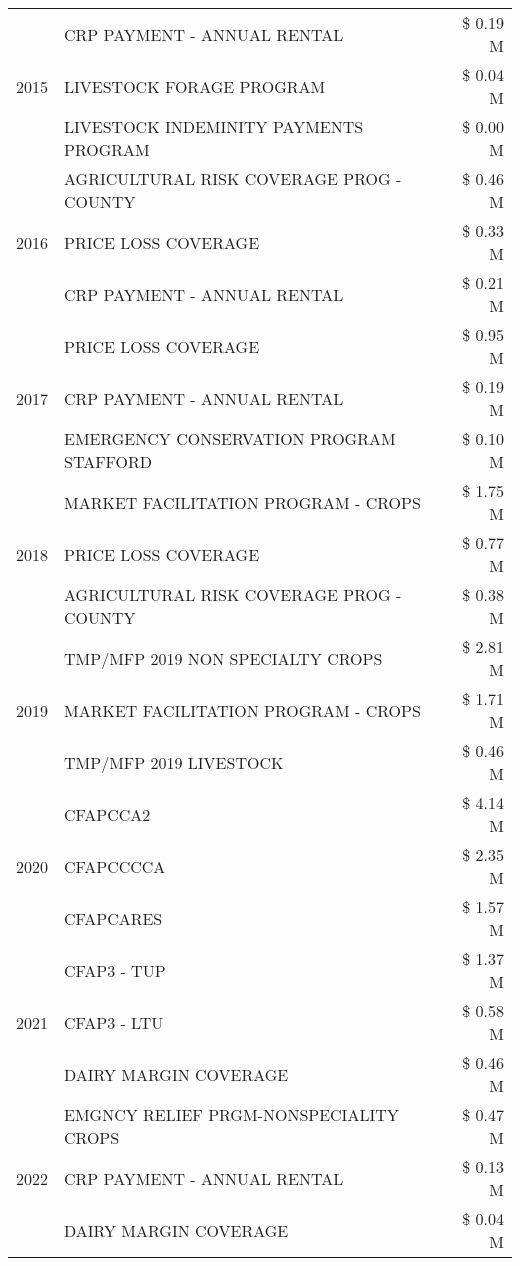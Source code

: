 \begin{tabular}{llr}
\multirow[t]{3}{*}{2015} & CRP PAYMENT - ANNUAL RENTAL & \$ 0.19 M \\
 & LIVESTOCK FORAGE PROGRAM & \$ 0.04 M \\
 & LIVESTOCK INDEMINITY PAYMENTS PROGRAM & \$ 0.00 M \\
\cline{1-3}
\multirow[t]{3}{*}{2016} & AGRICULTURAL RISK COVERAGE PROG - COUNTY & \$ 0.46 M \\
 & PRICE LOSS COVERAGE & \$ 0.33 M \\
 & CRP PAYMENT - ANNUAL RENTAL & \$ 0.21 M \\
\cline{1-3}
\multirow[t]{3}{*}{2017} & PRICE LOSS COVERAGE & \$ 0.95 M \\
 & CRP PAYMENT - ANNUAL RENTAL & \$ 0.19 M \\
 & EMERGENCY CONSERVATION PROGRAM STAFFORD & \$ 0.10 M \\
\cline{1-3}
\multirow[t]{3}{*}{2018} & MARKET FACILITATION PROGRAM - CROPS & \$ 1.75 M \\
 & PRICE LOSS COVERAGE & \$ 0.77 M \\
 & AGRICULTURAL RISK COVERAGE PROG - COUNTY & \$ 0.38 M \\
\cline{1-3}
\multirow[t]{3}{*}{2019} & TMP/MFP 2019 NON SPECIALTY CROPS & \$ 2.81 M \\
 & MARKET FACILITATION PROGRAM - CROPS & \$ 1.71 M \\
 & TMP/MFP 2019 LIVESTOCK & \$ 0.46 M \\
\cline{1-3}
\multirow[t]{3}{*}{2020} & CFAPCCA2 & \$ 4.14 M \\
 & CFAPCCCCA & \$ 2.35 M \\
 & CFAPCARES & \$ 1.57 M \\
\cline{1-3}
\multirow[t]{3}{*}{2021} & CFAP3 - TUP & \$ 1.37 M \\
 & CFAP3 - LTU & \$ 0.58 M \\
 & DAIRY MARGIN COVERAGE & \$ 0.46 M \\
\cline{1-3}
\multirow[t]{3}{*}{2022} & EMGNCY RELIEF PRGM-NONSPECIALITY CROPS & \$ 0.47 M \\
 & CRP PAYMENT - ANNUAL RENTAL & \$ 0.13 M \\
 & DAIRY MARGIN COVERAGE & \$ 0.04 M \\
\cline{1-3}
\bottomrule
\end{tabular}
